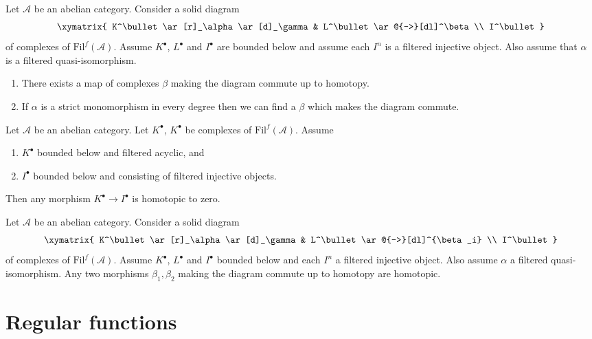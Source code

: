 \begin{exercise}
\label{exercise-morphisms-lift}
Let $\mathcal{A}$ be an abelian category.
Consider a solid diagram
$$
\xymatrix{
K^\bullet \ar[r]_\alpha \ar[d]_\gamma & L^\bullet \ar@{-->}[dl]^\beta \\
I^\bullet
}
$$
of complexes of $\text{Fil}^f(\mathcal{A})$. Assume
$K^\bullet$, $L^\bullet$ and $I^\bullet$ are bounded below and
assume each $I^n$ is a filtered injective object.
Also assume that $\alpha$ is a filtered quasi-isomorphism.
\begin{enumerate}
\item There exists a map of complexes $\beta$ making the diagram
commute up to homotopy.
\item If $\alpha$ is a strict monomorphism in every degree
then we can find a $\beta$ which makes the diagram commute.
\end{enumerate}
\end{exercise}

\begin{exercise}
\label{exercise-acyclic-is-zero}
Let $\mathcal{A}$ be an abelian category.
Let $K^\bullet$, $K^\bullet$ be complexes of $\text{Fil}^f(\mathcal{A})$.
Assume
\begin{enumerate}
\item $K^\bullet$ bounded below and filtered acyclic, and
\item $I^\bullet$ bounded below and consisting of filtered injective objects.
\end{enumerate}
Then any morphism $K^\bullet \to I^\bullet$ is homotopic to zero.
\end{exercise}

\begin{exercise}
\label{exercise-morphisms-equal-up-to-homotopy}
Let $\mathcal{A}$ be an abelian category.
Consider a solid diagram
$$
\xymatrix{
K^\bullet \ar[r]_\alpha \ar[d]_\gamma & L^\bullet \ar@{-->}[dl]^{\beta_i} \\
I^\bullet
}
$$
of complexes of $\text{Fil}^f(\mathcal{A})$.
Assume $K^\bullet$, $L^\bullet$ and $I^\bullet$ bounded below and
each $I^n$ a filtered injective
object. Also assume $\alpha$ a filtered quasi-isomorphism.
Any two morphisms $\beta_1, \beta_2$ making the diagram commute
up to homotopy are homotopic.
\end{exercise}







\section{Regular functions}
\label{section-regular-functions}


